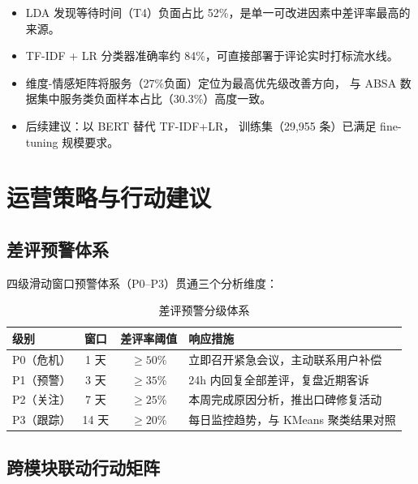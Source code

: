 \documentclass[12pt, a4paper]{article}
\newenvironment{insightbox}[1][关键结论]{%
  \begin{tcolorbox}[
    colback=LightGray, colframe=BoxBorder,
    title=\textbf{#1},
    fonttitle=\bfseries\color{white},
    coltitle=white,
    boxrule=0.8pt, arc=3pt,
    left=6pt, right=6pt, top=4pt, bottom=4pt
  ]
}{%
  \end{tcolorbox}
}
\begin{document}
\begin{insightbox}[文本分析关键结论]
  \begin{itemize}[leftmargin=1.5em, itemsep=2pt]
    \item LDA 发现等待时间（T4）负面占比 52\%，是单一可改进因素中差评率最高的来源。
    \item TF-IDF + LR 分类器准确率约 84\%，可直接部署于评论实时打标流水线。
    \item 维度-情感矩阵将服务（27\%负面）定位为最高优先级改善方向，
          与 ABSA 数据集中服务类负面样本占比（30.3\%）高度一致。
    \item 后续建议：以 BERT 替代 TF-IDF+LR，
          训练集（29,955 条）已满足 fine-tuning 规模要求。
  \end{itemize}
\end{insightbox}

\section{运营策略与行动建议}

\subsection{差评预警体系}

四级滑动窗口预警体系（P0--P3）贯通三个分析维度：

\begin{table}[H]
\centering
\caption{差评预警分级体系}
\label{tab:alert}
\begin{tabularx}{\textwidth}{l c c X}
\toprule
\textbf{级别} & \textbf{窗口} & \textbf{差评率阈值} & \textbf{响应措施} \\
\midrule
P0（危机） & 1 天  & $\geq 50\%$ & 立即召开紧急会议，主动联系用户补偿 \\
P1（预警） & 3 天  & $\geq 35\%$ & 24h 内回复全部差评，复盘近期客诉 \\
P2（关注） & 7 天  & $\geq 25\%$ & 本周完成原因分析，推出口碑修复活动 \\
P3（跟踪） & 14 天 & $\geq 20\%$ & 每日监控趋势，与 KMeans 聚类结果对照 \\
\bottomrule
\end{tabularx}
\end{table}

\subsection{跨模块联动行动矩阵}
\end{document}
